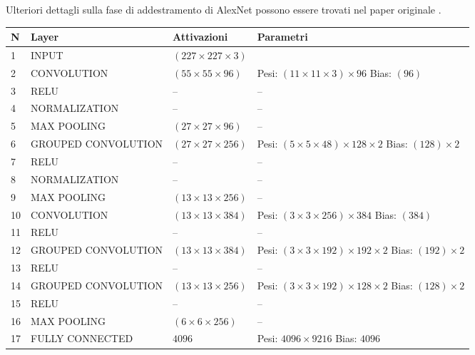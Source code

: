 Ulteriori dettagli sulla fase di addestramento di AlexNet possono essere trovati nel paper originale \cite{alexnet}.

\begin{table}[h]
\begin{tabularx}{\textwidth}{@{}llll@{}}
\toprule
N & Layer           & Attivazioni & Parametri \\ \midrule
1  &
INPUT &
$(227\times 227\times 3)$ &
\\ \midrule
2  & CONVOLUTION     & $(55\times 55\times 96)$ &\acapo{Pesi: $(11\times 11\times 3)\times 96$\\Bias: $(96)$} \\
3  & RELU            & --            & --\\
4  & NORMALIZATION   & --            & --\\
5  & MAX POOLING     & $(27\times 27\times 96)$ & -- \\ \midrule
6  & GROUPED CONVOLUTION     & $(27\times 27\times 256)$ & \acapo{Pesi: $(5\times 5\times 48)\times 128\times 2$\\Bias: $(128)\times 2$} \\
7  & RELU            & --            & --          \\
8  & NORMALIZATION   & --            & --          \\
9  & MAX POOLING     & $(13\times 13\times 256)$            &--           \\ \midrule
10 & CONVOLUTION     & $(13\times 13\times 384)$            & \acapo{Pesi: $(3\times 3\times 256)\times 384$\\Bias: $(384)$}          \\
11 & RELU            & --            &   --        \\ \midrule
12 & GROUPED CONVOLUTION     & $(13\times 13\times 384)$ & \acapo{Pesi: $(3\times 3\times 192)\times 192\times 2$\\Bias: $(192)\times 2$}  \\
13 & RELU            & --            &       --    \\ \midrule
14 & GROUPED CONVOLUTION     & $(13\times 13\times 256)$            & \acapo{Pesi: $(3\times 3\times 192)\times 128\times 2$\\Bias: $(128)\times 2$}\\
15 & RELU            & --            &   --        \\
16 & MAX POOLING     &$(6\times 6\times 256)$            &     --      \\ \midrule
17 & FULLY CONNECTED &$4096$& \acapo{Pesi: $4096\times 9216$\\Bias: $4096$} \\ 

\end{tabularx}
\end{table}
